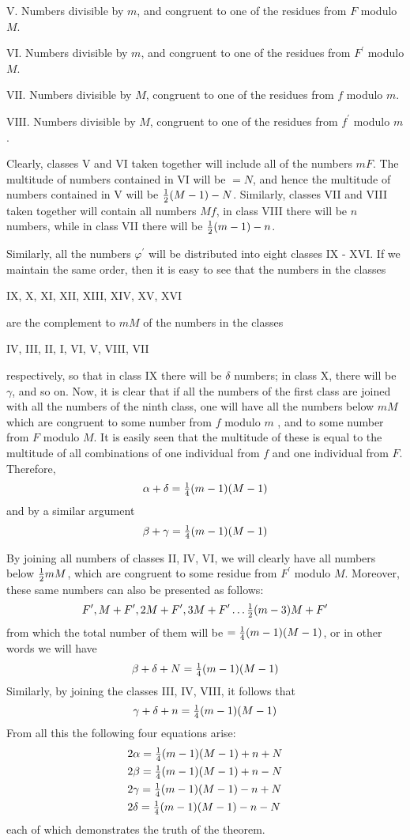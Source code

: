 \documentclass[twoside,12pt]{memoir}
\let\oldfrac\frac
\def\frac#1#2{\mathchoice{\tfrac{#1}{#2}}{\oldfrac{#1}{#2}}{\genfrac{}{}{}{2}{#1}{#2\mathstrut}}{\genfrac{}{}{}{3}{#1}{#2\mathstrut}}}
\begin{document}
\(\text{V.}\) Numbers divisible by \(m\), and congruent to one of the residues from \(F\) modulo \(M\).

\(\text{VI.}\) Numbers divisible by \(m\), and congruent to one of the residues from \(F^{\prime}\) modulo \(M\).

\(\text{VII.}\) Numbers divisible by \(M\), congruent to one of the residues from \(f\) modulo \(m\).

\(\text{VIII.}\) Numbers divisible by \(M\), congruent to one of the residues from \(f^{\prime}\) modulo \(m\).

Clearly, classes V and VI taken together will include all of the numbers \(mF\).  The multitude of numbers contained in VI will be \(=N\), and hence the multitude of numbers contained in V will be \(\frac{1}{2}(M-1)-N\). Similarly, classes VII and VIII taken together will contain all numbers \(Mf\), in class VIII there will be \(n\) numbers, while in class VII there will be \(\frac{1}{2}(m-1)-n\).

Similarly, all the numbers \(\varphi^{\prime}\) will be distributed into eight classes IX - XVI. If we maintain the same order, then it is easy to see that the numbers in the classes
\begin{center} IX, X, XI, XII, XIII, XIV, XV, XVI \end{center}
are the complement to \(mM\) of the numbers in the classes
\begin{center} IV, III, II, I, VI, V, VIII, VII \end{center}
respectively, so that in class IX there will be \(\delta\) numbers; in class X, there will be \(\gamma\), and so on. Now, it is clear that if all the numbers of the first class are joined with all the numbers of the ninth class, one will have all the numbers below \(m M\) which are congruent to some number from \(f\) modulo \(m\) , and to some number from \(F\) modulo \(M\).  It is easily seen that the multitude of these is equal to the multitude of all combinations of one individual from \(f\) and one individual from \(F\). Therefore,
\[\alpha+\delta=\frac{1}{4}(m-1)(M-1)\]\pagebreak%
and by a similar argument
\[\beta+\gamma=\frac{1}{4}(m-1)(M-1)\]

By joining all numbers of classes II, IV, VI, we will clearly have all numbers below \(\frac{1}{2} m M\), which are congruent to some residue from \(F^{\prime}\) modulo \(M\).  Moreover, these same numbers can also be presented as follows:
\[F^{\prime}, M+F^{\prime}, 2 M+F^{\prime}, 3 M+F^{\prime}  \ldots \frac{1}{2}(m-3) M+F^{\prime}\]
from which the total number of them will be \(=\frac{1}{4}(m-1)(M-1)\), or in other words we will have
\[ \beta+\delta+N=\frac{1}{4}(m-1)(M-1) \]
Similarly, by joining the classes III, IV, VIII, it follows that
\[ \gamma+\delta+n=\frac{1}{4}(m-1)(M-1) \]
From all this the following four equations arise:
\[\begin{aligned}
&2 \alpha=\frac{1}{4}(m-1)(M-1)+n+N  \\
&2 \beta=\frac{1}{4}(m-1)(M-1)+n-N  \\
&2 \gamma=\frac{1}{4}(m-1)(M-1)-n+N  \\
&2 \delta=\frac{1}{4}(m-1)(M-1)-n-N  
\end{aligned}\]
each of which demonstrates the truth of the theorem. 
\end{document}
